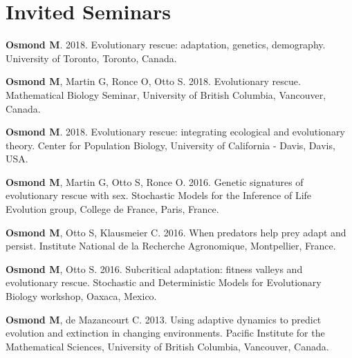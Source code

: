 \documentclass[12pt]{article}
\begin{document}
%

\section*{Invited Seminars}

\textbf{Osmond M}. 2018. Evolutionary rescue: adaptation, genetics, demography. University of Toronto, Toronto, Canada.

\textbf{Osmond M}, Martin G, Ronce O, Otto S. 2018. Evolutionary rescue. Mathematical Biology Seminar, University of British Columbia, Vancouver, Canada.

\textbf{Osmond M}. 2018. Evolutionary rescue: integrating ecological and evolutionary theory. Center for Population Biology, University of California - Davis, Davis, USA. 

\textbf{Osmond M}, Martin G, Otto S, Ronce O. 2016. Genetic signatures of evolutionary rescue with sex. Stochastic Models for the Inference of Life Evolution group, College de France, Paris, France. 

\textbf{Osmond M}, Otto S, Klausmeier C. 2016. When predators help prey adapt and persist. Institute National de la Recherche Agronomique, Montpellier, France. 

\textbf{Osmond M}, Otto S. 2016. Subcritical adaptation: fitness valleys and evolutionary rescue. Stochastic and Deterministic Models for Evolutionary Biology workshop, Oaxaca, Mexico. 


\textbf{Osmond M}, de Mazancourt C. 2013. Using adaptive dynamics to predict evolution and extinction in changing environments. Pacific Institute for the Mathematical Sciences, University of British Columbia, Vancouver, Canada.
\end{document}
